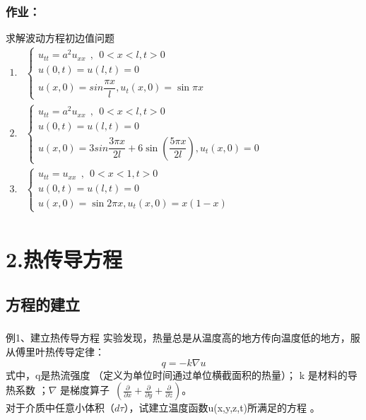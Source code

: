 \begin{frame}
	\frametitle{作业：}	
	求解波动方程初边值问题
	$\begin{array}{lllllllll}
	1. & \begin{cases}
		u_{tt} =a^2u_{xx} ~~,~~ 0<x<l, t>0\\
		u(0,t) =u(l,t)=0 \\
		u(x,0) =sin \dfrac{\pi x}{l} ,  u_t (x,0)=\sin \pi x 
	\end{cases}\\	
	2. &\begin{cases}
		u_{tt} =a^2u_{xx} ~~,~~ 0<x<l, t>0\\
		u(0,t) =u(l,t)=0 \\
		u(x,0) =3sin \dfrac{3\pi x}{2l} +6\sin(\dfrac{5\pi x}{2l}),  u_t (x,0)=0
	\end{cases} \\	
	3. &\begin{cases}
		u_{tt} =u_{xx} ~~,~~ 0<x<1, t>0\\
		u(0,t) =u(l,t)=0  \\
		u(x,0) =\sin 2\pi x ,  u_t (x,0)=x (1-x) 
	\end{cases} \\	
	\end{array}$ \\ 	
\end{frame}	


\section{2.热传导方程}
\subsection{方程的建立}
\begin{frame}
	\frametitle{}	
	\begin{exampleblock} {例1、建立热传导方程}
		实验发现，热量总是从温度高的地方传向温度低的地方，服从傅里叶热传导定律：
		\begin{equation*}
			q=-k\nabla u
		\end{equation*}
		式中，q是热流强度 （定义为单位时间通过单位横截面积的热量）； k 是材料的导热系数 ；$\nabla $ 是梯度算子~$(\frac{\partial }{\partial x} +\frac{\partial }{\partial y} +\frac{\partial }{\partial z})$。\\
		对于介质中任意小体积（$d\tau $），试建立温度函数u(x,y,z,t)所满足的方程 。\\
		~~~\hspace*{\fill} \\	
	\end{exampleblock}
\end{frame}	

